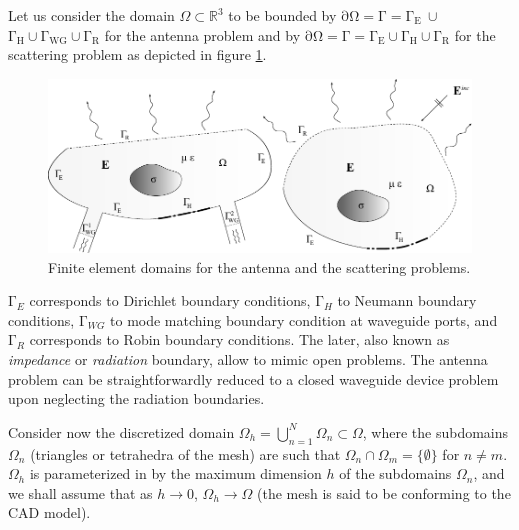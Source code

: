 Let us consider the domain $\Omega \subset \mathbb{R}^3$ to be bounded by $\mathrm{\partial \Omega = \Gamma = \Gamma_E~\cup }$ $\mathrm{\Gamma_{H} \cup \Gamma_{WG} \cup \Gamma_R}$ for the antenna problem and by $\mathrm{\partial \Omega = \Gamma = \Gamma_E \cup \Gamma_{H} \cup \Gamma_R}$ for the scattering problem as depicted in figure \ref{fig:FEMproblem}.
\begin{figure}[hbpt!]
\centering
\includegraphics[width=\textwidth]{FEMproblem} 
\caption{Finite element domains for the antenna and the  scattering problems.}
\label{fig:FEMproblem}
\end{figure}

$\mathrm{\Gamma}_E$ corresponds to Dirichlet boundary conditions, $\mathrm{\Gamma}_H$ to Neumann boundary conditions, $\mathrm{\Gamma}_{WG}$ to mode matching boundary condition at waveguide ports, and $\mathrm{\Gamma}_R$ corresponds to Robin boundary conditions. The later, also known as \textit{impedance} or \textit{radiation} boundary, allow to mimic open problems. The antenna problem can be straightforwardly reduced to a closed waveguide device problem upon neglecting the radiation boundaries.

Consider now the discretized domain $\Omega_h = \bigcup_{n=1}^{N} \Omega_n \subset \Omega$, where the subdomains $\Omega_n$ (triangles or tetrahedra of the mesh) are such that $\Omega_n \cap \Omega_m = \{ \emptyset \}$ for $n \neq m$. $\Omega_h$ is parameterized in by the maximum dimension $h$ of the subdomains $\Omega_n$, and we shall assume that as $h \to 0$, $\Omega_h \to \Omega$ (the mesh is said to be conforming to the CAD model).

